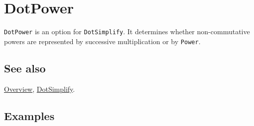 \documentclass[../FeynCalcManual.tex]{subfiles}
\begin{document}
\hypertarget{dotpower}{%
\section{DotPower}\label{dotpower}}

\texttt{DotPower} is an option for \texttt{DotSimplify}. It determines
whether non-commutative powers are represented by successive
multiplication or by \texttt{Power}.

\subsection{See also}

\hyperlink{toc}{Overview}, \hyperlink{dotsimplify}{DotSimplify}.

\subsection{Examples}
\end{document}
